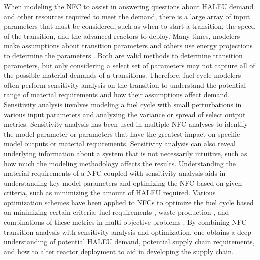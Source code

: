 When modeling the \gls{NFC} to assist in answering questions about 
\gls{HALEU} demand and other resources required to meet the demand, 
there is a large array of input parameters that must be considered, 
such as when to start a transition, the speed of the 
transition, and the advanced reactors to deploy. Many times, modelers make 
assumptions about transition parameters 
\cite{sunny_transition_2015, djokic_application_2015}
and others use energy projections to determine the parameters 
\cite{dixon_estimated_2022}. Both are valid methods to determine 
transition parameters, but only considering a select set of parameters may 
not capture all of the possible material demands of a transitions. 
Therefore, fuel cycle modelers often perform sensitivity analysis on 
the transition to understand the potential range of material 
requirements and how their assumptions affect demand. 
Sensitivity analysis involves 
modeling a fuel cycle with small perturbations in various input 
parameters and analyzing the variance or spread of select output metrics. 
Sensitivity analysis has been used in multiple \gls{NFC} analyses 
\cite{chee_sensitivity_2019,feng_sensitivity_2020,thiolliere_methodology_2018,passerini_sensitivity_2012}
to identify the model parameter or parameters that have the greatest 
impact on specific model outputs or material requirements. Sensitivity 
analysis can also reveal underlying information about a system that is not 
necessarily intuitive, such as how much the modeling methodology 
affects the results. Understanding the 
material requirements of a \gls{NFC} coupled with sensitivity analysis 
aids in understanding key model parameters and optimizing the 
\gls{NFC} based on given criteria, such as 
minimizing the amount of \gls{HALEU} required. Various 
optimization schemes have been applied to \glspl{NFC} to optimize the fuel 
cycle based on minimizing certain criteria: fuel requirements \cite{kim_selection_1999},
waste production \cite{shwageraus_optimization_2003}, and combinations 
of these metrics in multi-objective 
problems \cite{passerini_systematic_2014}. By combining \gls{NFC} transition 
analysis with sensitivity analysis and optimization, one obtains
a deep understanding of potential \gls{HALEU} demand, potential supply 
chain requirements, and how to alter reactor deployment to aid in developing 
the supply chain. 

